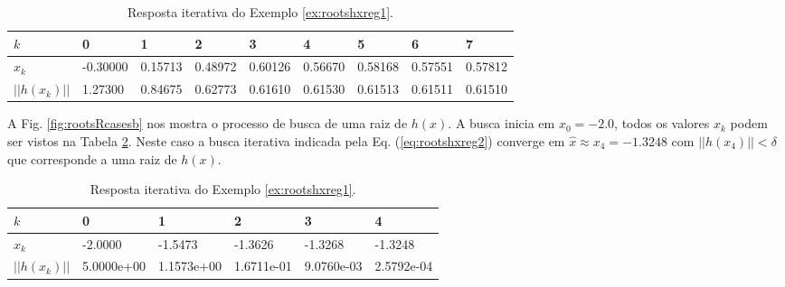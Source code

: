 \begin{table}[!h]
\centering
\begin{tabular}{|l|l|l|l|l|l|l|l|l|}
\hline
$k$      & 0 & 1 & 2 & 3 & 4 & 5 & 6 & 7\\ \hline
$x_k$    & -0.30000 & 0.15713 & 0.48972 & 0.60126 & 0.56670 & 0.58168 & 0.57551 & 0.57812 \\ \hline
$||h(x_k)||$ & 1.27300  & 0.84675 & 0.62773 & 0.61610 & 0.61530 & 0.61513 & 0.61511 & 0.61510 \\ \hline
\end{tabular}
\caption{Resposta iterativa do Exemplo \ref{ex:rootshxreg1}.}
\label{tab:rootsRcases1}
\end{table}

\begin{SolutionT}\label{sol:rootshxreg2}
A Fig. \ref{fig:rootsRcasesb} nos mostra o processo de busca de uma raiz de $h(x)$. 
A busca inicia em $x_0=-2.0$,
 todos os valores $x_{k}$ podem ser vistos na Tabela \ref{tab:rootsRcases2}. 
Neste caso a busca iterativa indicada pela Eq. (\ref{eq:rootshxreg2}) converge 
em $\hat{x}\approx x_4 = -1.3248$ com $||h(x_4)||<\delta$ que corresponde a uma raiz de $h(x)$.
\end{SolutionT}

\begin{table}[!h]
\centering
\begin{tabular}{|l|l|l|l|l|l|}
\hline
$k$      & 0 & 1 & 2 & 3 & 4 \\ \hline
$x_k$    & -2.0000 & -1.5473 & -1.3626 & -1.3268 & -1.3248 \\ \hline
$||h(x_k)||$ & 5.0000e+00 & 1.1573e+00 & 1.6711e-01 & 9.0760e-03 & 2.5792e-04 \\ \hline
\end{tabular}
\caption{Resposta iterativa do Exemplo \ref{ex:rootshxreg1}.}
\label{tab:rootsRcases2}
\end{table}

